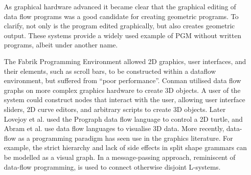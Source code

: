 \FloatBarrier 

As graphical hardware advanced it became clear that the graphical editing of data flow programs was a good candidate for creating geometric programs. To clarify, not only is the program edited graphically, but also creates geometric output. These systems provide a widely used example of PGM without written programs, albeit under another name. 

The Fabrik Programming Environment\cite{Ludolph88} allowed 2D graphics, user interfaces, and their elements, such as scroll bars, to be constructed within a dataflow environment, but suffered from ``poor performance''. Conman\cite{Haeberli88} utilised data flow graphs on more complex graphics hardware to create 3D objects. A user of the system could construct nodes that interact with the user, allowing user interface sliders, 2D curve editors, and arbitrary scripts to create 3D objects.
Later Lovejoy et al. used the Prograph data flow language to control a 2D turtle\cite{Lovejoy92}, and Abram et al. use data flow languages to visualise 3D data\cite{Abram95}.
More recently, data-flow as a programming paradigm has seen use in the graphics literature. For example, the strict hierarchy and lack of side effects in split shape grammars can be modelled as a visual graph\cite{Patow12}. In \cite{Benevs11} a message-passing approach, reminiscent of data-flow programming, is used to connect otherwise disjoint L-systems. 





